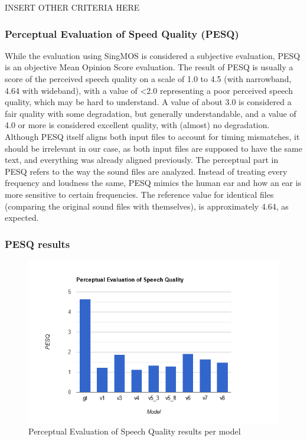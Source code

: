 \documentclass[a4paper]{article}
\begin{document}
\color{red}INSERT OTHER CRITERIA HERE\color{black}

\subsubsection{Perceptual Evaluation of Speed Quality (PESQ)}
While the evaluation using SingMOS is considered a subjective evaluation, PESQ
is an objective Mean Opinion Score evaluation. The result of PESQ is usually a
score of the perceived speech quality on a scale of 1.0 to 4.5 (with narrowband,
4.64 with wideband), with a value of <2.0 representing a poor perceived speech
quality, which may be hard to understand. A value of about 3.0 is considered a
fair quality with some degradation, but generally understandable, and a value of
4.0 or more is considered excellent quality, with (almost) no degradation.
Although PESQ itself aligns both input files to account for timing mismatches,
it should be irrelevant in our case, as both input files are supposed to have
the same text, and everything was already aligned previously. The perceptual
part in PESQ refers to the way the sound files are analyzed. Instead of treating
every frequency and loudness the same, PESQ mimics the human ear and how an ear
is more sensitive to certain frequencies. The reference value for identical
files (comparing the original sound files with themselves), is approximately 4.64, as
expected.

\subsubsection{PESQ results}
\begin{figure}[hbtp]
    \includegraphics[width=\textwidth]{evaluation/graphs/PESQ.png}
    \caption{Perceptual Evaluation of Speech Quality results per model}
    \label{fig:pesq_results}
\end{figure}
\end{document}
